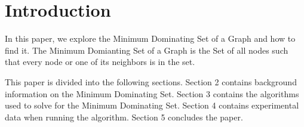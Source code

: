 \documentclass[paper.tex]{subfiles}
\begin{document}
\section{Introduction}

In this paper, we explore the Minimum Dominating Set of a Graph and how to find it.
The Minimum Domianting Set of a Graph is the Set of all nodes such that every node or one of its neighbors is in the set.

This paper is divided into the following sections. 
Section 2 contains background information on the Minimum Dominating Set.
Section 3 contains the algorithms used to solve for the Minimum Dominating Set.
Section 4 contains experimental data when running the algorithm.
Section 5 concludes the paper.
\end{document}
